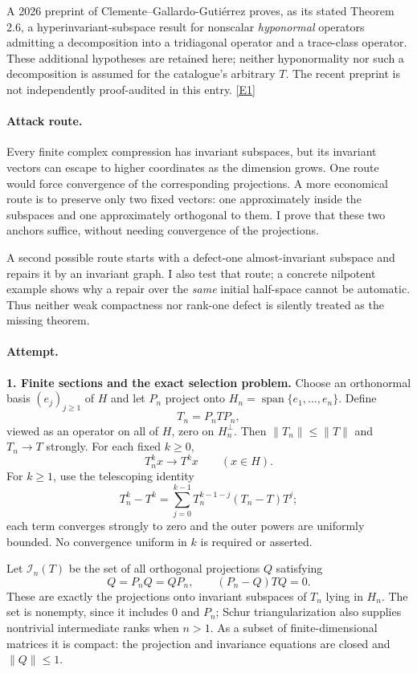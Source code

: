 \documentclass[11pt,a4paper]{article}
\newcommand{\eref}[2]{\hyperlink{extra:#1:#2}{[E#2]}}
\numberwithin{equation}{section}
\begin{document}
A 2026 preprint of Clemente--Gallardo-Guti\'errez proves, as its stated
Theorem 2.6, a hyperinvariant-subspace result for nonscalar \emph{hyponormal}
operators admitting a decomposition into a tridiagonal operator and a
trace-class operator. These additional hypotheses are retained here; neither
hyponormality nor such a decomposition is assumed for the catalogue's
arbitrary $T$. The recent preprint is not independently proof-audited in
this entry. \eref{108}{1}

\paragraph{Attack route.}
Every finite complex compression has invariant subspaces, but its invariant
vectors can escape to higher coordinates as the dimension grows. One route
would force convergence of the corresponding projections. A more economical
route is to preserve only two fixed vectors: one approximately inside the
subspaces and one approximately orthogonal to them. I prove that these two
anchors suffice, without needing convergence of the projections.

A second possible route starts with a defect-one almost-invariant subspace
and repairs it by an invariant graph. I also test that route; a concrete
nilpotent example shows why a repair over the \emph{same} initial half-space
cannot be automatic. Thus neither weak compactness nor rank-one defect is
silently treated as the missing theorem.

\paragraph{Attempt.}
\textbf{1. Finite sections and the exact selection problem.}
Choose an orthonormal basis $(e_j)_{j\geq1}$ of $H$ and let $P_n$ project onto
$H_n=\operatorname{span}\{e_1,\ldots,e_n\}$. Define
\[
 T_n=P_nTP_n,
\]
viewed as an operator on all of $H$, zero on $H_n^\perp$. Then
$\|T_n\|\leq\|T\|$ and $T_n\to T$ strongly. For each fixed $k\geq0$,
\begin{equation}\label{108:powers}
 T_n^k x\longrightarrow T^k x\qquad(x\in H).
\end{equation}
For $k\geq1$, use the telescoping identity
\[
 T_n^k-T^k=\sum_{j=0}^{k-1}T_n^{k-1-j}(T_n-T)T^j;
\]
each term converges strongly to zero and the outer powers are uniformly
bounded. No convergence uniform in $k$ is required or asserted.

Let $\mathcal I_n(T)$ be the set of all orthogonal projections $Q$ satisfying
\begin{equation}\label{108:finite-invariance}
 Q=P_nQ=QP_n,\qquad (P_n-Q)TQ=0.
\end{equation}
These are exactly the projections onto invariant subspaces of $T_n$ lying
in $H_n$. The set is nonempty, since it includes $0$ and $P_n$; Schur
triangularization also supplies nontrivial intermediate ranks when $n>1$.
As a subset of finite-dimensional matrices it is compact: the projection
and invariance equations are closed and $\|Q\|\leq1$.
\end{document}
